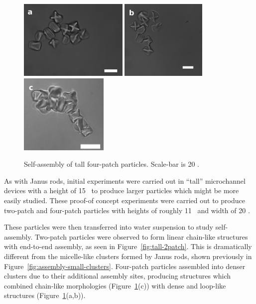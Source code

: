 \begin{figure}[h]
\begin{center}
\includegraphics[height=1.5in]{figures/complex-shapes/4patch-sb20-01.png} \includegraphics[height=1.5in]{figures/complex-shapes/4patch-sb20-02.png} \includegraphics[height=1.5in]{figures/complex-shapes/4patch-sb20-03.png}
\end{center}
\caption{Self-assembly of tall four-patch particles. Scale-bar is 20 \microns.}
\label{fig:tall-4patch}
\end{figure}

As with Janus rods, initial experiments were carried out in ``tall'' microchannel devices with a height of
15 \microns~to produce larger particles which might be more easily studied.  These proof-of concept
experiments were carried out to produce two-patch and four-patch particles with heights of roughly 11
\microns~and width of 20 \microns.  

These particles were then transferred into water suspension to 
study self-assembly.  Two-patch particles were observed to form linear chain-like structures
with end-to-end assembly, as seen in Figure~\ref{fig:tall-2patch}.  This is dramatically different from
the micelle-like clusters formed by Janus rods, shown previously in 
Figure~\ref{fig:assembly-small-clusters}.  Four-patch particles assembled into denser clusters due
to their additional assembly sites, producing structures which combined chain-like 
morphologies (Figure~\ref{fig:tall-4patch}(c)) with dense and loop-like structures 
(Figure~\ref{fig:tall-4patch}(a,b)).

